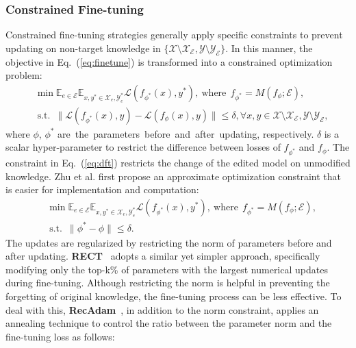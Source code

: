 \documentclass[acmsmall, screen]{acmart}
\def \st{\;\text{s.t.}\;}
\begin{document}
\subsubsection{\textbf{Constrained Fine-tuning}} Constrained fine-tuning strategies generally apply specific constraints to prevent updating on non-target knowledge in $\{\mathcal{X}\setminus \mathcal{X}_\mathcal{E},\mathcal{Y}\setminus \mathcal{Y}_\mathcal{E}\}$. In this manner, the objective in Eq.~(\ref{eq:finetune}) is transformed into a constrained optimization problem:
\begin{equation}
    \begin{aligned}
    & \min \mathbb{E}_{e \in \mathcal{E}} \mathbb{E}_{x, y^{*} \in \mathcal{X}_e, \mathcal{Y}^*_e} \mathcal{L} (f_{\phi^*}(x), y^{*}),\ \text{where}\ \  f_{\phi^*}=M(f_\phi; \mathcal{E}),\\
    & \st\ \|\mathcal{L}(f_{\phi^*}(x), y)-\mathcal{L}(f_{\phi}(x), y)\| \leq \delta, \forall x,y\in \mathcal{X}\setminus \mathcal{X}_\mathcal{E},\mathcal{Y}\setminus \mathcal{Y}_\mathcal{E},
    \end{aligned}
        \label{eq:dft}
\end{equation}
where $\phi$, $\phi^*$ are\ the\ parameters\ before\ and\ after\ updating, respectively. $\delta$ is a scalar hyper-parameter to restrict the difference between losses of $f_{\phi^*}$ and $f_\phi$. The constraint in Eq.~(\ref{eq:dft}) restricts the change of the edited model on unmodified knowledge. Zhu et al. \cite{zhu2020modifying} first propose an approximate optimization constraint that is easier for implementation and computation:
\begin{equation}
    \begin{aligned}
    & \min \mathbb{E}_{e \in \mathcal{E}} \mathbb{E}_{x, y^{*} \in \mathcal{X}_e, \mathcal{Y}^*_e} \mathcal{L} (f_{\phi^*}(x), y^{*}),\ \text{where}\ \  f_{\phi^*}=M(f_\phi; \mathcal{E}),\\
    & \st\ \|\phi^*-\phi\| \leq \delta.
    \end{aligned}
  \label{eq:16}
\end{equation}
The updates are regularized by restricting the norm of parameters before and after updating. 
{
\textbf{RECT}~\cite{gu2024model} adopts a similar yet simpler approach, specifically modifying only the top-k\% of parameters with the largest numerical updates during fine-tuning.}
Although restricting the norm is helpful in preventing the forgetting of original knowledge, the fine-tuning process can be less effective. To deal with this, \textbf{RecAdam}~\cite{chen2020recall}, in addition to the norm constraint, applies an annealing technique to control the ratio between the parameter norm and the fine-tuning loss as follows:
\end{document}
